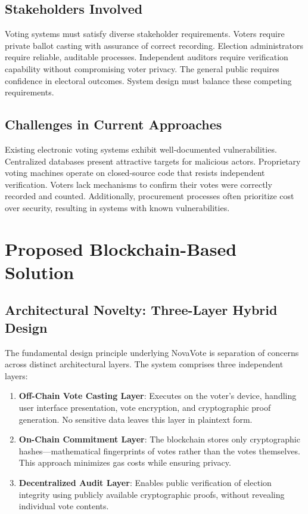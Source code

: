 \documentclass[conference]{IEEEtran}
\begin{document}
\subsection{Stakeholders Involved}
Voting systems must satisfy diverse stakeholder requirements. Voters require private ballot casting with assurance of correct recording. Election administrators require reliable, auditable processes. Independent auditors require verification capability without compromising voter privacy. The general public requires confidence in electoral outcomes. System design must balance these competing requirements.

\subsection{Challenges in Current Approaches}
Existing electronic voting systems exhibit well-documented vulnerabilities. Centralized databases present attractive targets for malicious actors. Proprietary voting machines operate on closed-source code that resists independent verification. Voters lack mechanisms to confirm their votes were correctly recorded and counted. Additionally, procurement processes often prioritize cost over security, resulting in systems with known vulnerabilities.

\section{Proposed Blockchain-Based Solution}

\subsection{Architectural Novelty: Three-Layer Hybrid Design}
The fundamental design principle underlying NovaVote is separation of concerns across distinct architectural layers. The system comprises three independent layers:

\begin{enumerate}
    \item \textbf{Off-Chain Vote Casting Layer}: Executes on the voter's device, handling user interface presentation, vote encryption, and cryptographic proof generation. No sensitive data leaves this layer in plaintext form.
    \item \textbf{On-Chain Commitment Layer}: The blockchain stores only cryptographic hashes---mathematical fingerprints of votes rather than the votes themselves. This approach minimizes gas costs while ensuring privacy.
    \item \textbf{Decentralized Audit Layer}: Enables public verification of election integrity using publicly available cryptographic proofs, without revealing individual vote contents.
\end{enumerate}
\end{document}
